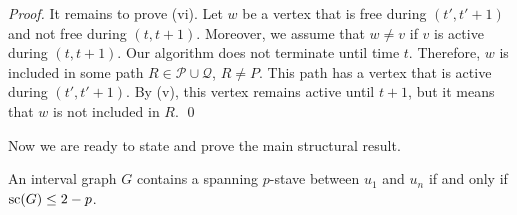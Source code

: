 \documentclass{llncs}
\DeclareMathOperator{\scat}{{\rm sc}}
\newcommand{\cP}{{\mathcal P}}
\newcommand{\cQ}{{\mathcal Q}}
\begin{document}
\begin{proof}
It remains to prove (vi). Let $w$ be a vertex that is free during $(t',t'+1)$ and not free during $(t,t+1)$. Moreover, we assume that $w\neq v$ if $v$ is active during $(t,t+1)$.
Our algorithm does not terminate until time $t$. Therefore, $w$ is included in some path $R\in\cP\cup\cQ$, $R\neq P$. This path has  a vertex that is active during $(t',t'+1)$. 
By (v), this vertex remains active until $t+1$, but it means that $w$ is not included in $R$. \qed
\end{proof}

Now we are ready to state and prove the main structural result.

\begin{theorem}\label{thm:syst}
An interval graph $G$ contains a spanning $p$-stave between $u_1$ and $u_n$ 
if and only if $\scat(G)\le 2-p$.
\end{theorem}
\end{document}
